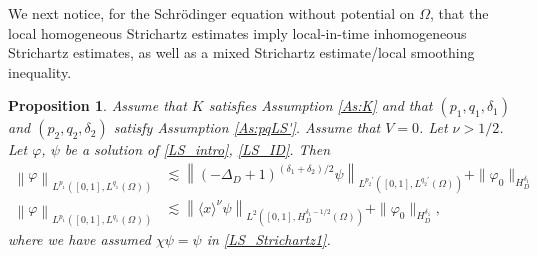 \documentclass[10pt,leqno]{amsart}
\newtheorem{proposition}[theorem]{Proposition}
\theoremstyle{definition}%
\theoremstyle{remark}
\numberwithin{equation}{section}
\renewcommand{\^}{\widehat}%
\newcommand{\la}{\langle}
\newcommand{\ra}{\rangle}
\begin{document}
We next notice, for the Schr\"odinger equation without potential on $\Omega$, that the local homogeneous Strichartz estimates imply local-in-time inhomogeneous Strichartz estimates, as well as a mixed Strichartz estimate/local smoothing inequality.
\begin{proposition}
 \label{P:local_estimates}
 Assume that $K$ satisfies Assumption \ref{As:K} and that $(p_1,q_1,\delta_1)$ and $(p_2,q_2,\delta_2)$  satisfy Assumption \ref{As:pqLS'}.
 Assume that $V=0$. 
 Let $\nu>1/2$. Let $\varphi$, $\psi$ be a solution of \eqref{LS_intro}, \eqref{LS_ID}.  Then
 \begin{align}
 \label{LS_Strichartz1}
\left\|\varphi\right\|_{L^{p_1}\left([0,1],L^{q_1}(\Omega)\right)}&\lesssim \left\|(-\Delta_D+1)^{(\delta_1+\delta_2)/2}\psi\right\|_{L^{p_2'}\left([0,1],L^{q_2'}(\Omega)\right)}+\|\varphi_0\|_{H_D^{\delta_1}}\\
\label{LS_mixte}
\left\|\varphi\right\|_{L^{p_1}\left([0,1],L^{q_1}(\Omega)\right)}&\lesssim \left\|\la x\ra^{\nu}\psi\right\|_{L^{2}\left([0,1],H_D^{\delta_1-1/2}(\Omega)\right)}+\|\varphi_0\|_{H_D^{\delta_1}},
\end{align}
where we have assumed $\chi\psi=\psi$ in \eqref{LS_Strichartz1}.
\end{proposition}
\end{document}
